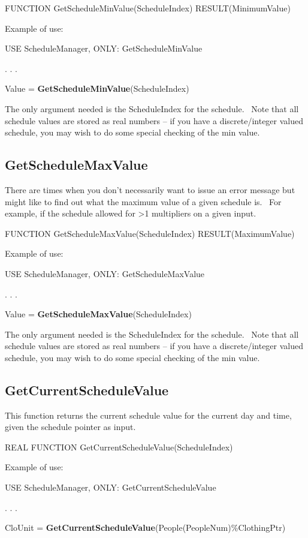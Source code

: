 FUNCTION GetScheduleMinValue(ScheduleIndex) RESULT(MinimumValue)

Example of use:

USE ScheduleManager, ONLY: GetScheduleMinValue

. . .

Value = \textbf{GetScheduleMinValue}(ScheduleIndex)

The only argument needed is the ScheduleIndex for the schedule.~ Note that all schedule values are stored as real numbers -- if you have a discrete/integer valued schedule, you may wish to do some special checking of the min value.

\subsection{GetScheduleMaxValue}\label{getschedulemaxvalue}

There are times when you don't necessarily want to issue an error message but might like to find out what the maximum value of a given schedule is.~ For example, if the schedule allowed for \textgreater{}1 multipliers on a given input.

FUNCTION GetScheduleMaxValue(ScheduleIndex) RESULT(MaximumValue)

Example of use:

USE ScheduleManager, ONLY: GetScheduleMaxValue

. . .

Value = \textbf{GetScheduleMaxValue}(ScheduleIndex)

The only argument needed is the ScheduleIndex for the schedule.~ Note that all schedule values are stored as real numbers -- if you have a discrete/integer valued schedule, you may wish to do some special checking of the min value.

\subsection{GetCurrentScheduleValue}\label{getcurrentschedulevalue}

This function returns the current schedule value for the current day and time, given the schedule pointer as input.

REAL FUNCTION GetCurrentScheduleValue(ScheduleIndex)

Example of use:

USE ScheduleManager, ONLY: GetCurrentScheduleValue

. . .

CloUnit = \textbf{GetCurrentScheduleValue}(People(PeopleNum)\%ClothingPtr)

